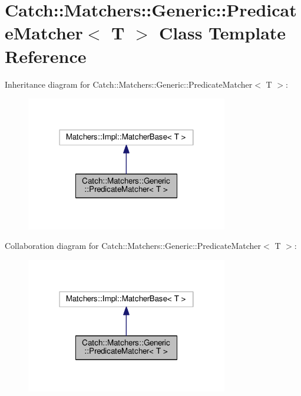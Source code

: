 \hypertarget{classCatch_1_1Matchers_1_1Generic_1_1PredicateMatcher}{}\section{Catch\+:\+:Matchers\+:\+:Generic\+:\+:Predicate\+Matcher$<$ T $>$ Class Template Reference}
\label{classCatch_1_1Matchers_1_1Generic_1_1PredicateMatcher}


Inheritance diagram for Catch\+:\+:Matchers\+:\+:Generic\+:\+:Predicate\+Matcher$<$ T $>$\+:\nopagebreak
\begin{figure}[H]
\begin{center}
\leavevmode
\includegraphics[width=250pt]{classCatch_1_1Matchers_1_1Generic_1_1PredicateMatcher__inherit__graph}
\end{center}
\end{figure}


Collaboration diagram for Catch\+:\+:Matchers\+:\+:Generic\+:\+:Predicate\+Matcher$<$ T $>$\+:\nopagebreak
\begin{figure}[H]
\begin{center}
\leavevmode
\includegraphics[width=250pt]{classCatch_1_1Matchers_1_1Generic_1_1PredicateMatcher__coll__graph}
\end{center}
\end{figure}
